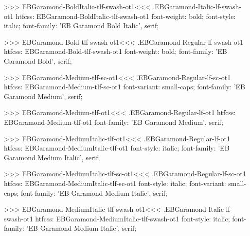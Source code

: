 {{{{{{{>>>
\<EBGaramond-BoldItalic-tlf-swash-ot1\><<<
.EBGaramond-Italic-lf-swash-ot1
htfcss:  EBGaramond-BoldItalic-tlf-swash-ot1  font-weight: bold; font-style: italic; font-family: 'EB Garamond Bold Italic', serif;

>>>
\<EBGaramond-Bold-tlf-swash-ot1\><<<
.EBGaramond-Regular-lf-swash-ot1
htfcss:  EBGaramond-Bold-tlf-swash-ot1  font-weight: bold; font-family: 'EB Garamond Bold', serif;

>>>
\<EBGaramond-Medium-tlf-sc-ot1\><<<
.EBGaramond-Regular-lf-sc-ot1
htfcss:  EBGaramond-Medium-tlf-sc-ot1  font-variant: small-caps; font-family: 'EB Garamond Medium', serif;

>>>
\<EBGaramond-Medium-tlf-ot1\><<<
.EBGaramond-Regular-lf-ot1
htfcss:  EBGaramond-Medium-tlf-ot1  font-family: 'EB Garamond Medium', serif;

>>>
\<EBGaramond-MediumItalic-tlf-ot1\><<<
.EBGaramond-Regular-lf-ot1
htfcss:  EBGaramond-MediumItalic-tlf-ot1  font-style: italic; font-family: 'EB Garamond Medium Italic', serif;

>>>
\<EBGaramond-MediumItalic-tlf-sc-ot1\><<<
.EBGaramond-Regular-lf-sc-ot1
htfcss:  EBGaramond-MediumItalic-tlf-sc-ot1  font-style: italic; font-variant: small-caps; font-family: 'EB Garamond Medium Italic', serif;

>>>
\<EBGaramond-MediumItalic-tlf-swash-ot1\><<<
.EBGaramond-Italic-lf-swash-ot1
htfcss:  EBGaramond-MediumItalic-tlf-swash-ot1  font-style: italic; font-family: 'EB Garamond Medium Italic', serif;

}}}}}}}
